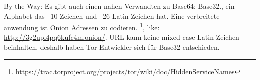 

By the Way: Es gibt auch einen nahen Verwandten zu Base64: Base32., ein Alphabet das ~10 Zeichen und ~26 Latin Zeichen hat. 
Eine verbreitete anwendung ist Onion Adressen zu codieren. 
\footnote{\url{https://trac.torproject.org/projects/tor/wiki/doc/HiddenServiceNames}},
like: \url{http://3g2upl4pq6kufc4m.onion/}.
\ac{URL} kann keine mixed-case Latin Zeichen beinhalten, deshalb haben Tor Entwickler sich für Base32 entschieden.


